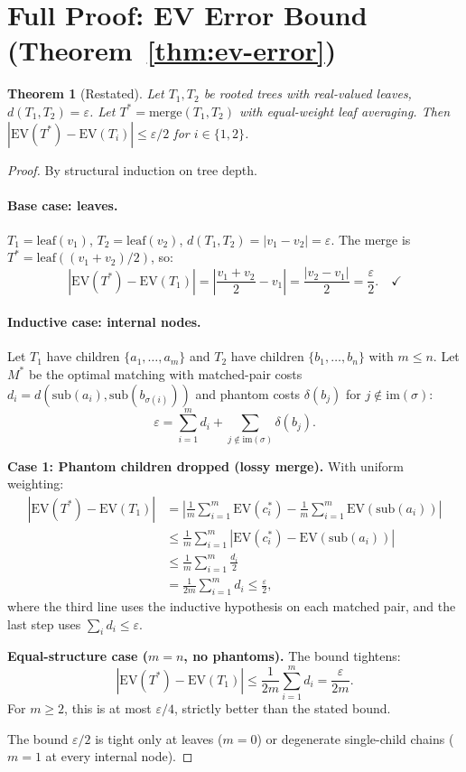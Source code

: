 \documentclass[11pt]{article}
\newtheorem*{theorem*}{Theorem}
\newcommand{\EV}{\mathrm{EV}}
\newcommand{\sub}{\mathrm{sub}}
\begin{document}
\section{Full Proof: EV Error Bound (Theorem~\ref{thm:ev-error})}
\label{app:ev-error}

\begin{theorem*}[Restated]
Let $T_1, T_2$ be rooted trees with real-valued leaves, $d(T_1, T_2) =
\varepsilon$. Let $T^* = \mathrm{merge}(T_1, T_2)$ with equal-weight
leaf averaging. Then $|\EV(T^*) - \EV(T_i)| \le \varepsilon/2$ for
$i \in \{1, 2\}$.
\end{theorem*}

\begin{proof}
By structural induction on tree depth.

\paragraph{Base case: leaves.} $T_1 = \mathrm{leaf}(v_1)$, $T_2 =
\mathrm{leaf}(v_2)$, $d(T_1, T_2) = |v_1 - v_2| = \varepsilon$. The
merge is $T^* = \mathrm{leaf}((v_1 + v_2)/2)$, so:
\[
  |\EV(T^*) - \EV(T_1)| = \left|\frac{v_1 + v_2}{2} - v_1\right| =
  \frac{|v_2 - v_1|}{2} = \frac{\varepsilon}{2}. \quad\checkmark
\]

\paragraph{Inductive case: internal nodes.} Let $T_1$ have children
$\{a_1, \ldots, a_m\}$ and $T_2$ have children $\{b_1, \ldots, b_n\}$
with $m \le n$. Let $M^*$ be the optimal matching with matched-pair
costs $d_i = d(\sub(a_i), \sub(b_{\sigma(i)}))$ and phantom costs
$\delta(b_j)$ for $j \notin \mathrm{im}(\sigma)$:
\[
  \varepsilon = \sum_{i=1}^m d_i + \sum_{j \notin \mathrm{im}(\sigma)}
  \delta(b_j).
\]

\textbf{Case 1: Phantom children dropped (lossy merge).} With uniform
weighting:
\begin{align*}
  |\EV(T^*) - \EV(T_1)| &= \left|\frac{1}{m}\sum_{i=1}^m \EV(c_i^*)
  - \frac{1}{m}\sum_{i=1}^m \EV(\sub(a_i))\right| \\
  &\le \frac{1}{m}\sum_{i=1}^m |\EV(c_i^*) - \EV(\sub(a_i))| \\
  &\le \frac{1}{m}\sum_{i=1}^m \frac{d_i}{2} \\
  &= \frac{1}{2m}\sum_{i=1}^m d_i \le \frac{\varepsilon}{2},
\end{align*}
where the third line uses the inductive hypothesis on each matched pair,
and the last step uses $\sum_i d_i \le \varepsilon$.

\textbf{Equal-structure case ($m = n$, no phantoms).} The bound
tightens:
\[
  |\EV(T^*) - \EV(T_1)| \le \frac{1}{2m}\sum_{i=1}^m d_i =
  \frac{\varepsilon}{2m}.
\]
For $m \ge 2$, this is at most $\varepsilon/4$, strictly better than
the stated bound.

The bound $\varepsilon/2$ is tight only at leaves ($m = 0$) or
degenerate single-child chains ($m = 1$ at every internal node).
\end{proof}
\end{document}
